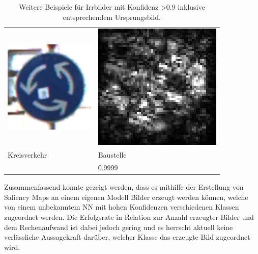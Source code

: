 \begin{table}
\begin{tabular}{p{4.4cm}p{4.4cm}}
		\includegraphics[height=4.4cm]{Images/AnPe/04709} &\includegraphics[width=\linewidth]{Images/AnPe/04709_int_grad}  \\
		Kreisverkehr &Baustelle \\
		& 0.9999
	\end{tabular}
	\caption{Weitere Beispiele für Irrbilder mit Konfidenz >0.9 inklusive entsprechendem Ursprungsbild. }
\label{tab:sal2}
\end{table}

Zusammenfassend konnte gezeigt werden, dass es mithilfe der Erstellung von Saliency Maps an einem eigenen Modell Bilder erzeugt werden können, welche von einem unbekanntem \ac{NN} mit hohen Konfidenzen verschiedenen Klassen zugeordnet werden. Die Erfolgsrate in Relation zur Anzahl erzeugter Bilder und dem Rechenaufwand ist dabei jedoch gering und es herrscht aktuell keine verlässliche Aussagekraft darüber, welcher Klasse das erzeugte Bild zugeordnet wird. 
